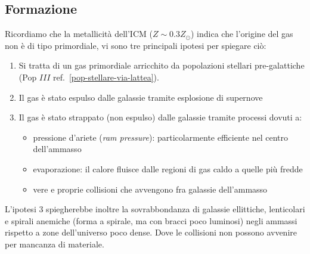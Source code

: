 \subsection{Formazione}
Ricordiamo che la metallicità dell'ICM ($Z\sim 0.3 Z_{\odot}$) indica che l'origine del gas non è di tipo primordiale, vi sono tre principali ipotesi per spiegare ciò:

\begin{enumerate}
    \item Si tratta di un gas primordiale arricchito da popolazioni stellari pre-galattiche (Pop $III$ ref.~\ref{pop-stellare-via-lattea}).
    \item Il gas è stato espulso dalle galassie tramite esplosione di supernove
    \item Il gas è stato strappato (non espulso) dalle galassie tramite processi dovuti a:
    \begin{itemize}
        \item pressione d'ariete (\emph{ram pressure}): particolarmente efficiente nel centro dell'ammasso
        \item evaporazione: il calore fluisce dalle regioni di gas caldo a quelle più fredde
        \item vere e proprie collisioni che avvengono fra galassie dell'ammasso
    \end{itemize}
\end{enumerate}

L'ipotesi $3$ spiegherebbe inoltre la sovrabbondanza di galassie ellittiche, lenticolari e spirali anemiche (forma a spirale, ma con bracci poco luminosi) negli ammassi rispetto a zone dell'universo poco dense. Dove le collisioni non possono avvenire per mancanza di materiale.
